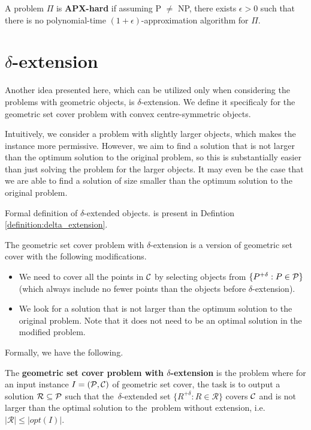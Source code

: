 \begin{defi}
A problem $\Pi$ is \textbf{APX-hard} if assuming P $\neq$ NP,
there exists $\epsilon > 0$
such that there is no polynomial-time $(1+\epsilon)$-approximation algorithm
for $\Pi$.
\end{defi}

\section{$\delta$-extension}
\label{section:def:delta_extension}

Another idea presented here, which can be utilized only when considering
the problems with geometric objects,
is $\delta$-extension.
We define it specificaly for the geometric set cover problem
with convex centre-symmetric objects.

Intuitively, we consider a problem with slightly larger objects,
which makes the instance more permissive.
However, we aim to find a solution that
is not larger than the
optimum solution to the original problem,
so this is substantially easier than just
solving the problem for the larger objects.
It may even be the case
that we are able to find a solution
of size smaller than the optimum solution
to the original problem.

Formal definition of $\delta$-extended objects.
is present in Defintion
\ref{definition:delta_extension}.

The geometric set cover problem with $\delta$-extension
is a version of geometric set cover with
the following modifications.
\begin{itemize}
\item We need to cover all the points in $\mathcal{C}$
by selecting objects from $\{P^{+\delta} : P \in \mathcal{P}\}$ (which always 
include no fewer points than the objects
before $\delta$-extension).
\item We look for a solution that is not larger than the optimum
solution to the original problem.
Note that it does not need to be an optimal solution in
the modified problem.
\end{itemize}
Formally, we have the following.

\begin{defi}
The \textbf{geometric set cover problem
with $\delta$-extension} is the problem where for an input instance
$I=(\mathcal{P}, \mathcal{C})$ of geometric set cover,
the task is to output a solution $\mathcal{R} \subseteq \mathcal{P}$
such that the~$\delta$-extended set
$\{ R^{+\delta} :  R \in \mathcal{R} \}$ covers $\mathcal{C}$
and is not larger than the optimal solution to the~problem without
extension, i.e.~$|\mathcal{R}| \le |opt(I)|$.
\end{defi}

